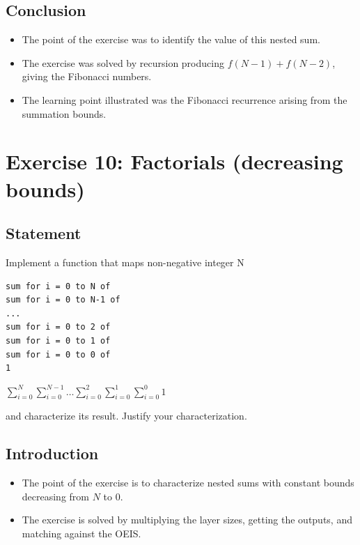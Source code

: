 \documentclass[12pt]{article}
\begin{document}

\subsection{Conclusion}

\begin{itemize}

\item
  The point of the exercise was to identify the value of this nested sum.

\item
  The exercise was solved by recursion producing $f(N-1) + f(N-2)$, giving the Fibonacci numbers.

\item
  The learning point illustrated was the Fibonacci recurrence arising from the summation bounds.

\end{itemize}


\newpage

\section{Exercise 10: Factorials (decreasing bounds)}


\subsection{Statement}

Implement a function that maps non-negative integer N

\begin{verbatim}
sum for i = 0 to N of
sum for i = 0 to N-1 of
...
sum for i = 0 to 2 of
sum for i = 0 to 1 of
sum for i = 0 to 0 of
1
\end{verbatim}

$\displaystyle\sum_{i=0}^{N}\sum_{i=0}^{N-1}\dots\sum_{i=0}^{2}\sum_{i=0}^{1}\sum_{i=0}^{0}1$

and characterize its result. Justify your characterization.


\subsection{Introduction}

\begin{itemize}

\item
  The point of the exercise is to characterize nested sums with constant bounds decreasing from $N$ to 0.

\item
  The exercise is solved by multiplying the layer sizes, getting the outputs, and matching against the OEIS.

\end{itemize}
\end{document}
